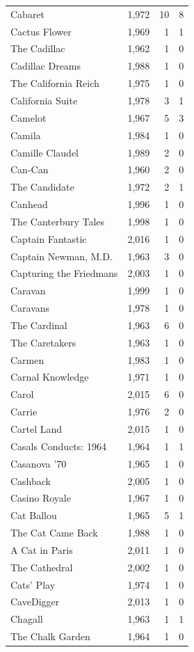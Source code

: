 \begin{tabular}{lrrr}
Cabaret & 1,972 & 10 & 8 \\
Cactus Flower & 1,969 & 1 & 1 \\
The Cadillac & 1,962 & 1 & 0 \\
Cadillac Dreams & 1,988 & 1 & 0 \\
The California Reich & 1,975 & 1 & 0 \\
California Suite & 1,978 & 3 & 1 \\
Camelot & 1,967 & 5 & 3 \\
Camila & 1,984 & 1 & 0 \\
Camille Claudel & 1,989 & 2 & 0 \\
Can-Can & 1,960 & 2 & 0 \\
The Candidate & 1,972 & 2 & 1 \\
Canhead & 1,996 & 1 & 0 \\
The Canterbury Tales & 1,998 & 1 & 0 \\
Captain Fantastic & 2,016 & 1 & 0 \\
Captain Newman, M.D. & 1,963 & 3 & 0 \\
Capturing the Friedmans & 2,003 & 1 & 0 \\
Caravan & 1,999 & 1 & 0 \\
Caravans & 1,978 & 1 & 0 \\
The Cardinal & 1,963 & 6 & 0 \\
The Caretakers & 1,963 & 1 & 0 \\
Carmen & 1,983 & 1 & 0 \\
Carnal Knowledge & 1,971 & 1 & 0 \\
Carol & 2,015 & 6 & 0 \\
Carrie & 1,976 & 2 & 0 \\
Cartel Land & 2,015 & 1 & 0 \\
Casals Conducts: 1964 & 1,964 & 1 & 1 \\
Casanova '70 & 1,965 & 1 & 0 \\
Cashback & 2,005 & 1 & 0 \\
Casino Royale & 1,967 & 1 & 0 \\
Cat Ballou & 1,965 & 5 & 1 \\
The Cat Came Back & 1,988 & 1 & 0 \\
A Cat in Paris & 2,011 & 1 & 0 \\
The Cathedral & 2,002 & 1 & 0 \\
Cats' Play & 1,974 & 1 & 0 \\
CaveDigger & 2,013 & 1 & 0 \\
Chagall & 1,963 & 1 & 1 \\
The Chalk Garden & 1,964 & 1 & 0 \\

\end{tabular}
